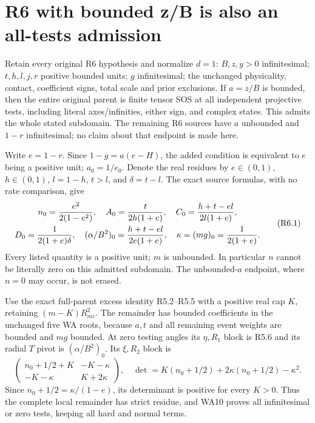 \section{R6 with bounded z/B is also an all-tests admission}
\label{sec:r17-r6-bounded-a}
\begin{theorem}
Retain every original R6 hypothesis and normalize $d=1$: $B,z,y>0$
infinitesimal; $t,h,l,j,r$ positive bounded units; $g$ infinitesimal;
the unchanged physicality, contact, coefficient signs, total scale and
prior exclusions. If $a=z/B$ is bounded, then the entire original
parent is finite tensor SOS at all independent projective tests,
including literal axes/infinities, either sign, and complex states.
This admits the whole stated subdomain. The remaining R6 sources have
$a$ unbounded and $1-r$ infinitesimal; no claim about that endpoint is
made here.
\end{theorem}

Write $e=1-r$. Since $1-g=a(e-H)$, the added condition is equivalent
to $e$ being a positive unit; $a_0=1/e_0$. Denote the real residues
by $e\in(0,1)$, $h\in(0,1)$, $l=1-h$, $t>l$, and $\delta=t-l$.
The exact source formulas, with no rate comparison, give
\[
\begin{gathered}
 n_0={e^2\over2(1-e^2)},\quad
 A_0={t\over2h(1+e)},\quad
 C_0={h+t-el\over2l(1+e)},\\
 D_0={1\over2(1+e)\delta},\quad
 (\alpha/B^2)_0={h+t-el\over2e(1+e)},\quad
 \kappa=(mg)_0={1\over2(1+e)}.
\end{gathered}                       \tag{R6.1}
\]
Every listed quantity is a positive unit; $m$ is unbounded. In
particular $n$ cannot be literally zero on this admitted subdomain.
The unbounded-$a$ endpoint, where $n=0$ may occur, is not erased.

Use the exact full-parent excess identity R5.2--R5.5 with a positive
real cap $K$, retaining $(m-K)R_{mc}^2$. The remainder has bounded
coefficients in the unchanged five WA roots, because $a,t$ and all
remaining event weights are bounded and $mg$ bounded. At zero testing
angles its $\eta,R_1$ block is R5.6 and its radial $T$ pivot is
$(\alpha/B^2)_0$. Its $\xi,R_2$ block is
\[
 \begin{pmatrix}n_0+1/2+K&-K-\kappa\\
                 -K-\kappa&K+2\kappa\end{pmatrix},
\quad\det=K(n_0+1/2)+2\kappa(n_0+1/2)-\kappa^2.     \tag{R6.2}
\]
Since $n_0+1/2=\kappa/(1-e)$, its determinant is positive for every
$K>0$. Thus the complete local remainder has strict residue, and WA10
proves all infinitesimal or zero tests, keeping all hard and normal terms.

